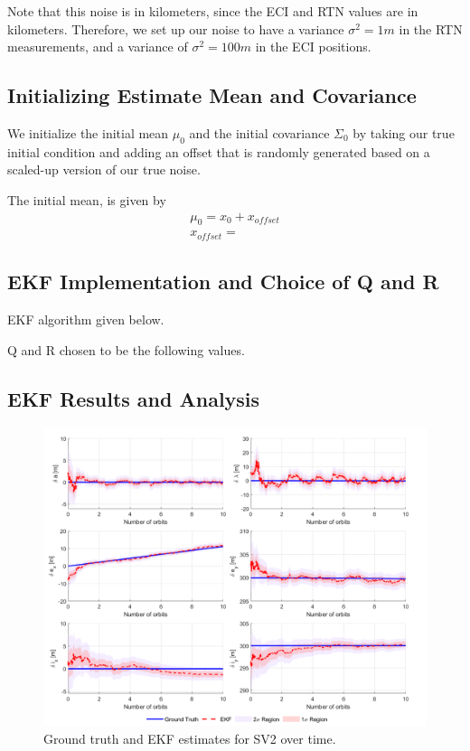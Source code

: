 Note that this noise is in kilometers, since the ECI and RTN values are in kilometers. Therefore, we set up our noise to have a variance $\sigma^2 = 1 m$ in the RTN measurements, and a variance of $\sigma^2 = 100 m$ in the ECI positions. 

\subsection{Initializing Estimate Mean and Covariance}

We initialize the initial mean $\mu_0$ and the initial covariance $\Sigma_0$ by taking our true initial condition and adding an offset that is randomly generated based on a scaled-up version of our true noise.

The initial mean, is given by 
\begin{align}
    \mu_0 = x_0 + x_{offset} \\
    x_{offset} =  
\end{align}

\subsection{EKF Implementation and Choice of Q and R}

EKF algorithm given below.

Q and R chosen to be the following values.

\subsection{EKF Results and Analysis}

\begin{figure}[H]
    \centering
    \includegraphics[width=0.8\linewidth]{sim/figures/PS8/ROE_over_time_SV2_comparison.png}
    \caption{Ground truth and EKF estimates for SV2 over time.}
    \label{fig:sv2_ekf_estimates}
\end{figure}

